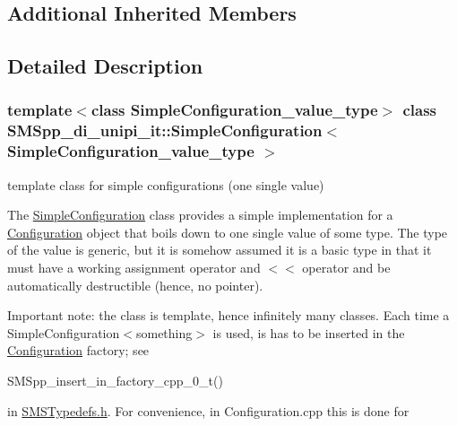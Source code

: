 \subsection*{Additional Inherited Members}


\subsection{Detailed Description}
\subsubsection*{template$<$class Simple\+Configuration\+\_\+value\+\_\+type$>$\newline
class S\+M\+Spp\+\_\+di\+\_\+unipi\+\_\+it\+::\+Simple\+Configuration$<$ Simple\+Configuration\+\_\+value\+\_\+type $>$}

template class for simple configurations (one single value) 

The \mbox{\hyperlink{class_s_m_spp__di__unipi__it_1_1_simple_configuration}{Simple\+Configuration}} class provides a simple implementation for a \mbox{\hyperlink{class_s_m_spp__di__unipi__it_1_1_configuration}{Configuration}} object that boils down to one single value of some type. The type of the value is generic, but it is somehow assumed it is a basic type in that it must have a working assignment operator and $<$$<$ operator and be automatically destructible (hence, no pointer).

Important note\+: the class is template, hence infinitely many classes. Each time a Simple\+Configuration$<$something$>$ is used, is has to be inserted in the \mbox{\hyperlink{class_s_m_spp__di__unipi__it_1_1_configuration}{Configuration}} factory; see \begin{DoxyVerb} SMSpp_insert_in_factory_cpp_0_t()
\end{DoxyVerb}


in \mbox{\hyperlink{_s_m_s_typedefs_8h}{S\+M\+S\+Typedefs.\+h}}. For convenience, in Configuration.\+cpp this is done for



